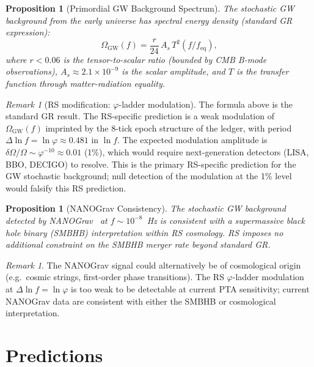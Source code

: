 \documentclass[12pt,a4paper]{article}
\newtheorem{proposition}[theorem]{Proposition}
\theoremstyle{definition}
\theoremstyle{remark}
\newtheorem{remark}[theorem]{Remark}
\begin{document}
\begin{proposition}[Primordial GW Background Spectrum]
\label{prop:primordial}
The stochastic GW background from the early universe has spectral
energy density (standard GR expression):
\begin{equation}
  \Omega_{\mathrm{GW}}(f) = \frac{r}{24}\,A_s\,
  T^2(f/f_{\mathrm{eq}}),
\end{equation}
where $r < 0.06$ is the tensor-to-scalar ratio (bounded by CMB
B-mode observations), $A_s \approx 2.1 \times 10^{-9}$ is the
scalar amplitude, and $T$ is the transfer function through
matter-radiation equality.
\end{proposition}

\begin{remark}[RS modification: $\varphi$-ladder modulation]
\label{rem:phi-mod}
The formula above is the standard GR result.  The RS-specific
prediction is a weak modulation of $\Omega_{\mathrm{GW}}(f)$
imprinted by the 8-tick epoch structure of the ledger, with period
$\Delta\ln f = \ln\varphi \approx 0.481$ in $\ln f$.  The expected
modulation amplitude is $\delta\Omega/\Omega \sim \varphi^{-10}
\approx 0.01$ (1\%), which would require next-generation detectors
(LISA, BBO, DECIGO) to resolve.  This is the primary RS-specific
prediction for the GW stochastic background; null detection of the
modulation at the 1\% level would falsify this RS prediction.
\end{remark}

\begin{proposition}[NANOGrav Consistency]
\label{prop:nanograv}
The stochastic GW background detected by NANOGrav~\cite{NANOGrav2023}
at $f \sim 10^{-8}$~Hz is consistent with a supermassive black hole
binary (SMBHB) interpretation within RS cosmology.  RS imposes no
additional constraint on the SMBHB merger rate beyond standard GR.
\end{proposition}

\begin{remark}
The NANOGrav signal could alternatively be of cosmological origin
(e.g.\ cosmic strings, first-order phase transitions).  The RS
$\varphi$-ladder modulation at $\Delta\ln f = \ln\varphi$ is too
weak to be detectable at current PTA sensitivity; current NANOGrav
data are consistent with either the SMBHB or cosmological
interpretation.
\end{remark}

\section{Predictions}
\label{sec:predictions}
\end{document}
